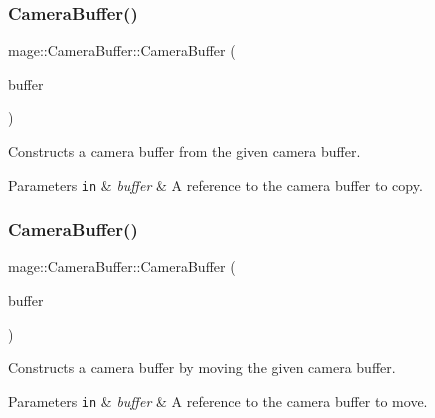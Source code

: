 \subsubsection{\texorpdfstring{Camera\+Buffer()}{CameraBuffer()}\hspace{0.1cm}{\footnotesize\ttfamily [2/3]}}
{\footnotesize\ttfamily mage\+::\+Camera\+Buffer\+::\+Camera\+Buffer (\begin{DoxyParamCaption}\item[{const \hyperlink{structmage_1_1_camera_buffer}{Camera\+Buffer} \&}]{buffer }\end{DoxyParamCaption})\hspace{0.3cm}{\ttfamily [default]}}

Constructs a camera buffer from the given camera buffer.


\begin{DoxyParams}[1]{Parameters}
\mbox{\tt in}  & {\em buffer} & A reference to the camera buffer to copy. \\
\hline
\end{DoxyParams}
\hypertarget{structmage_1_1_camera_buffer_a9ed685bdafbdc4b87546c082588f07c3}{}\label{structmage_1_1_camera_buffer_a9ed685bdafbdc4b87546c082588f07c3} 
\subsubsection{\texorpdfstring{Camera\+Buffer()}{CameraBuffer()}\hspace{0.1cm}{\footnotesize\ttfamily [3/3]}}
{\footnotesize\ttfamily mage\+::\+Camera\+Buffer\+::\+Camera\+Buffer (\begin{DoxyParamCaption}\item[{\hyperlink{structmage_1_1_camera_buffer}{Camera\+Buffer} \&\&}]{buffer }\end{DoxyParamCaption})\hspace{0.3cm}{\ttfamily [default]}}

Constructs a camera buffer by moving the given camera buffer.


\begin{DoxyParams}[1]{Parameters}
\mbox{\tt in}  & {\em buffer} & A reference to the camera buffer to move. \\
\hline
\end{DoxyParams}
\hypertarget{structmage_1_1_camera_buffer_a893ff21cfa017537ccd91dd816715701}{}\label{structmage_1_1_camera_buffer_a893ff21cfa017537ccd91dd816715701} 
